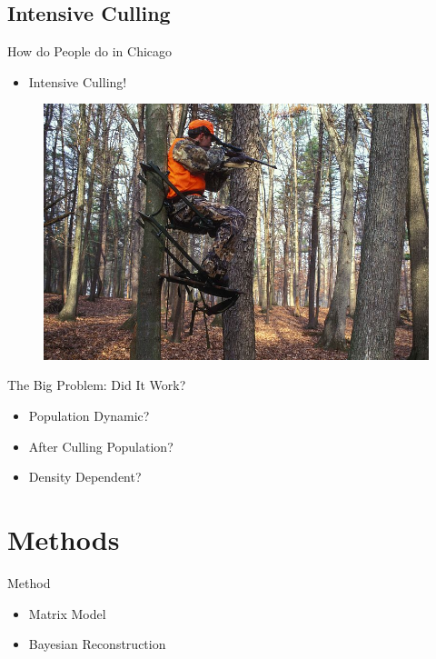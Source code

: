 \documentclass{beamer}
\begin{document}
\subsection{Intensive Culling}

\begin{frame}{How do People do in Chicago}
	\begin{itemize}
		\item Intensive Culling!
	\end{itemize}
	\begin{figure}[ht]
		\centering
		\includegraphics[scale=8]{fig/Chicago_deer/hunting.jpg}
		\label{sample_graph}
	\end{figure}
\end{frame}

\begin{frame}{The Big Problem: Did It Work?}
	\begin{itemize}
		\item Population Dynamic?
		\item After Culling Population?
		\item Density Dependent?
	\end{itemize}
\end{frame}

\section{Methods}
\begin{frame}{Method}
	\begin{itemize}
		\item Matrix Model
		\item Bayesian Reconstruction
	\end{itemize}
\end{frame}
\end{document}
